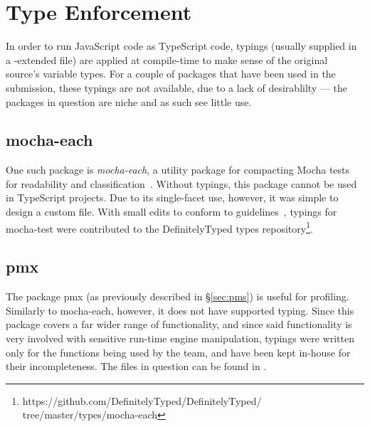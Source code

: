 \section{Type Enforcement}
In order to run JavaScript code as TypeScript code, typings (usually
supplied in a -extended file) are applied at compile-time to
make sense of the original source's variable types. For a couple of
packages that have been used in the submission, these typings are not
available, due to a lack of desirablilty --- the packages in question are
niche and as such see little use.

\subsection{mocha-each}
One such package is \emph{mocha-each}, a utility package for compacting
Mocha tests for readability and classification~\cite{mocha-each}. Without
typings, this package cannot be used in TypeScript projects. Due to its
single-facet use, however, it was simple to design a custom
 file. With small edits to conform to
guidelines~\cite{@types}, typings for
mocha-test were contributed to the DefinitelyTyped types repository\footnote{%
https://github.com/DefinitelyTyped/DefinitelyTyped/%
tree/master/types/mocha-each}.

\subsection{pmx}
The package pmx (as previously described in \S\ref{sec:pms}) is useful for
profiling. Similarly to mocha-each, however, it does not have supported typing.
Since this package covers a far wider range of functionality, and since said
functionality is very involved with sensitive run-time engine manipulation,
typings were written only for the functions being used by the team, and have
been kept in-house for their incompleteness. The files in question can be found
in .
